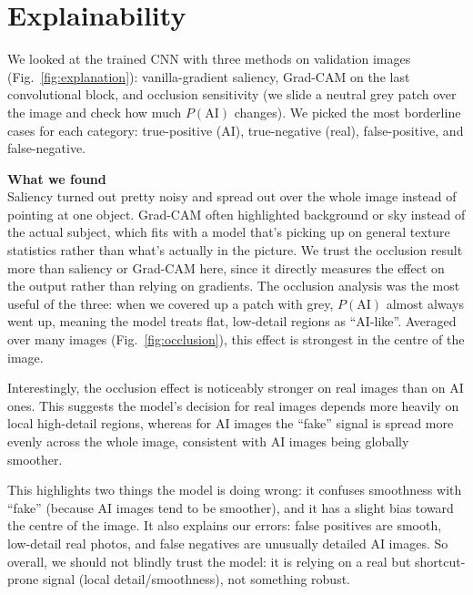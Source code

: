 \section{Explainability}

We looked at the trained CNN with three methods on validation images
(Fig.~\ref{fig:explanation}): vanilla-gradient saliency, Grad-CAM on the last
convolutional block, and occlusion sensitivity (we slide a neutral grey patch
over the image and check how much $P(\mathrm{AI})$ changes). We picked the most
borderline cases for each category: true-positive (AI), true-negative (real),
false-positive, and false-negative.


\textbf{What we found}\\
Saliency turned out pretty noisy and spread out over the whole image instead of
pointing at one object. Grad-CAM often highlighted background or sky instead of
the actual subject, which fits with a model that's picking up on general
texture statistics rather than what's actually in the picture. We trust the 
occlusion result more than saliency or Grad-CAM here, since it directly measures 
the effect on the output rather than relying on gradients. The occlusion
analysis was the most useful of the three: when we covered up a patch with grey,
$P(\mathrm{AI})$ almost always went up, meaning the model treats flat,
low-detail regions as ``AI-like''. Averaged over many images
(Fig.~\ref{fig:occlusion}), this effect is strongest in the centre of the image.

Interestingly, the occlusion effect is noticeably stronger on real images than 
on AI ones. This suggests the model's decision 
for real images depends more heavily on local high-detail regions, whereas for AI
images the ``fake'' signal is spread more evenly across the whole image, consistent
with AI images being globally smoother.

This highlights two things the model is doing wrong: it confuses smoothness with
``fake'' (because AI images tend to be smoother), and it has a slight bias
toward the centre of the image. It also explains our errors: false positives are
smooth, low-detail real photos, and false negatives are unusually detailed AI
images. So overall, we should not blindly trust the model: it is relying on a
real but shortcut-prone signal (local detail/smoothness), not something robust.

